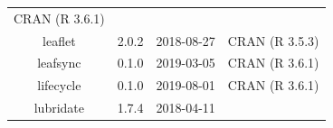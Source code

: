 \documentclass[11pt,]{book}
\begin{document}
\begin{longtable}[]{@{}cccc@{}}
\begin{minipage}[t]{0.36\columnwidth}
CRAN (R 3.6.1)\strut
\end{minipage}\tabularnewline
\begin{minipage}[t]{0.18\columnwidth}\centering\strut
leaflet\strut
\end{minipage} & \begin{minipage}[t]{0.19\columnwidth}\centering\strut
2.0.2\strut
\end{minipage} & \begin{minipage}[t]{0.16\columnwidth}\centering\strut
2018-08-27\strut
\end{minipage} & \begin{minipage}[t]{0.36\columnwidth}\centering\strut
CRAN (R 3.5.3)\strut
\end{minipage}\tabularnewline
\begin{minipage}[t]{0.18\columnwidth}\centering\strut
leafsync\strut
\end{minipage} & \begin{minipage}[t]{0.19\columnwidth}\centering\strut
0.1.0\strut
\end{minipage} & \begin{minipage}[t]{0.16\columnwidth}\centering\strut
2019-03-05\strut
\end{minipage} & \begin{minipage}[t]{0.36\columnwidth}\centering\strut
CRAN (R 3.6.1)\strut
\end{minipage}\tabularnewline
\begin{minipage}[t]{0.18\columnwidth}\centering\strut
lifecycle\strut
\end{minipage} & \begin{minipage}[t]{0.19\columnwidth}\centering\strut
0.1.0\strut
\end{minipage} & \begin{minipage}[t]{0.16\columnwidth}\centering\strut
2019-08-01\strut
\end{minipage} & \begin{minipage}[t]{0.36\columnwidth}\centering\strut
CRAN (R 3.6.1)\strut
\end{minipage}\tabularnewline
\begin{minipage}[t]{0.18\columnwidth}\centering\strut
lubridate\strut
\end{minipage} & \begin{minipage}[t]{0.19\columnwidth}\centering\strut
1.7.4\strut
\end{minipage} & \begin{minipage}[t]{0.16\columnwidth}\centering\strut
2018-04-11\strut
\end{minipage} & \begin{minipage}[t]{0.36\columnwidth}\centering\strut

\end{minipage}
\end{longtable}
\end{document}
